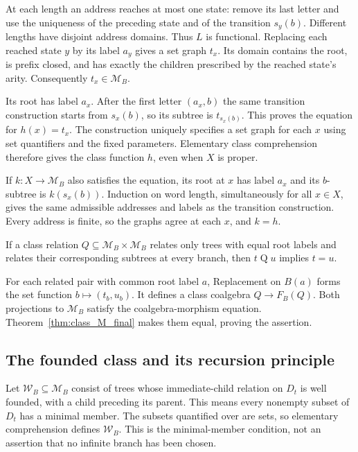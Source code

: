 At each length an address reaches at most one state: remove its last
letter and use the uniqueness of the preceding state and of the
transition $s_y(b)$. Different lengths have disjoint address domains.
Thus $L$ is functional. Replacing each reached state $y$ by its label
$a_y$ gives a set graph $t_x$. Its domain contains the root, is prefix
closed, and has exactly the children prescribed by the reached state's
arity. Consequently $t_x\in\mathcal M_B$.

Its root has label $a_x$. After the first letter $(a_x,b)$ the same
transition construction starts from $s_x(b)$, so its subtree is
$t_{s_x(b)}$. This proves the equation for $h(x)=t_x$.
The construction uniquely specifies a set graph for each $x$ using
set quantifiers and the fixed parameters. Elementary class comprehension
therefore gives the class function $h$, even when $X$ is proper.

If $k:X\to\mathcal M_B$ also satisfies the equation, its root at $x$
has label $a_x$ and its $b$-subtree is $k(s_x(b))$. Induction on word
length, simultaneously for all $x\in X$, gives the same admissible
addresses and labels as the transition construction. Every address is
finite, so the graphs agree at each $x$, and $k=h$.
\Done

\begin{corollary}
If a class relation $Q\subseteq\mathcal M_B\times\mathcal M_B$
relates only trees with equal root labels and relates their corresponding
subtrees at every branch, then $t\mathrel Q u$ implies $t=u$.
\end{corollary}
\Proof
For each related pair with common root label $a$, Replacement on $B(a)$
forms the set function $b\mapsto(t_b,u_b)$. It defines a class
coalgebra $Q\to F_B(Q)$. Both projections to $\mathcal M_B$ satisfy
the coalgebra-morphism equation. Theorem~\ref{thm:class_M_final} makes
them equal, proving the assertion.
\Done

\subsection{The founded class and its recursion principle}
Let $\mathcal W_B\subseteq\mathcal M_B$ consist of trees whose
immediate-child relation on $D_t$ is well founded, with a child preceding
its parent. This means every nonempty subset of $D_t$ has a minimal
member. The subsets quantified over are sets, so elementary comprehension
defines $\mathcal W_B$. This is the minimal-member condition, not an
assertion that no infinite branch has been chosen.

